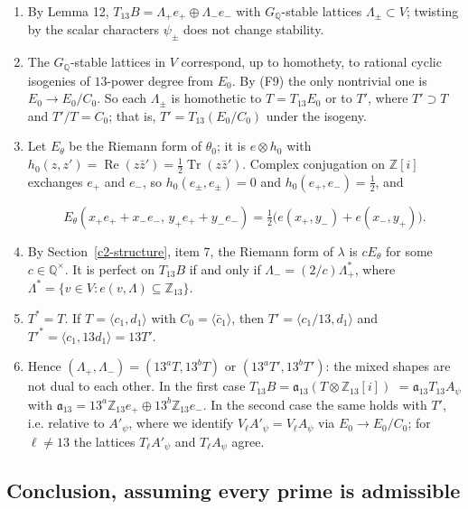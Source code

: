 \documentclass[11pt]{article}
\newcommand{\Q}{\mathbb Q}
\newcommand{\Z}{\mathbb Z}
\begin{document}
\begin{enumerate}
\item By Lemma 12, \(T_{13}B=\Lambda_+e_+\oplus\Lambda_-e_-\) with \(G_{\Q}\)-stable lattices
          \(\Lambda_\pm\subset V\); twisting by the scalar characters \(\psi_\pm\) does not change stability.
\item The \(G_{\Q}\)-stable lattices in \(V\) correspond, up to homothety, to rational cyclic isogenies of
          \(13\)-power degree from \(E_0\). By (F9) the only nontrivial one is \(E_0\to E_0/C_0\). So each
          \(\Lambda_\pm\) is homothetic to \(T=T_{13}E_0\) or to \(T'\), where \(T'\supset T\) and \(T'/T=C_0\);
          that is, \(T'=T_{13}(E_0/C_0)\) under the isogeny.
\item Let \(E_\theta\) be the Riemann form of \(\theta_0\); it is \(e\otimes h_0\) with
          \(h_0(z,z')=\operatorname{Re}(z\bar z')=\tfrac12\operatorname{Tr}(z\bar z')\). Complex conjugation on
          \(\Z[i]\) exchanges \(e_+\) and \(e_-\), so \(h_0(e_\pm,e_\pm)=0\) and \(h_0(e_+,e_-)=\tfrac12\), and

\[
E_\theta(x_+e_++x_-e_-,\,y_+e_++y_-e_-)=\tfrac12\bigl(e(x_+,y_-)+e(x_-,y_+)\bigr).
\]
\item By Section~\ref{c2-structure}, item 7, the Riemann form of \(\lambda\) is \(cE_\theta\) for some
          \(c\in\Q^\times\). It is perfect on \(T_{13}B\) if and only if \(\Lambda_-=(2/c)\Lambda_+^*\), where
          \(\Lambda^*=\{v\in V:e(v,\Lambda)\subseteq\Z_{13}\}\).
\item \(T^*=T\). If \(T=\langle c_1,d_1\rangle\) with \(C_0=\langle\bar c_1\rangle\), then
          \(T'=\langle c_1/13,d_1\rangle\) and \(T'^*=\langle c_1,13d_1\rangle=13T'\).
\item Hence \((\Lambda_+,\Lambda_-)=(13^aT,13^bT)\) or \((13^aT',13^bT')\): the mixed shapes are not
          dual to each other. In the first case \(T_{13}B=\mathfrak a_{13}(T\otimes\Z_{13}[i])\) \({}=\mathfrak a_{13}T_{13}A_\psi\)
          with \(\mathfrak a_{13}=13^a\Z_{13}e_+\oplus13^b\Z_{13}e_-\). In the second case the same holds with
          \(T'\), i.e. relative to \(A'_\psi\), where we identify \(V_\ell A'_\psi=V_\ell A_\psi\) via
          \(E_0\to E_0/C_0\); for \(\ell\neq13\) the lattices \(T_\ell A'_\psi\) and \(T_\ell A_\psi\) agree.
\end{enumerate}

\subsection{Conclusion, assuming every prime is admissible}\label{c2-conclusion}
\end{document}
